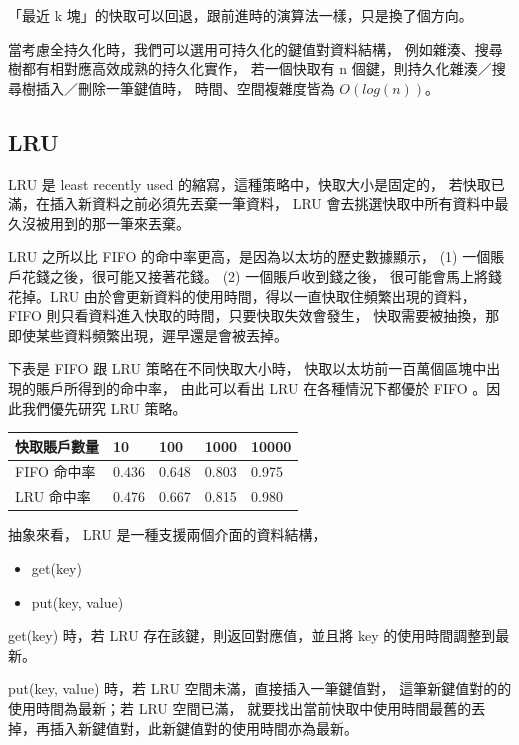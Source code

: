 「最近 k 塊」的快取可以回退，跟前進時的演算法一樣，只是換了個方向。

當考慮全持久化時，我們可以選用可持久化的鍵值對資料結構，
例如雜湊\cite{bagwell2001ideal}\cite{puente2017persistence}\cite{hinze2006finger}、搜尋樹都有相對應高效成熟的持久化實作，
若一個快取有 n 個鍵，則持久化雜湊／搜尋樹插入／刪除一筆鍵值時，
時間、空間複雜度皆為 $O(log(n))$。

\subsection{LRU}

LRU 是 least recently used 的縮寫，這種策略中，快取大小是固定的，
若快取已滿，在插入新資料之前必須先丟棄一筆資料，
LRU 會去挑選快取中所有資料中最久沒被用到的那一筆來丟棄。

LRU 之所以比 FIFO 的命中率更高，是因為以太坊的歷史數據顯示，
(1) 一個賬戶花錢之後，很可能又接著花錢。 (2) 一個賬戶收到錢之後，
很可能會馬上將錢花掉。LRU 由於會更新資料的使用時間，得以一直快取住頻繁出現的資料，
FIFO 則只看資料進入快取的時間，只要快取失效會發生，
快取需要被抽換，那即使某些資料頻繁出現，遲早還是會被丟掉。

下表是 FIFO 跟 LRU 策略在不同快取大小時，
快取以太坊前一百萬個區塊中出現的賬戶所得到的命中率，
由此可以看出 LRU 在各種情況下都優於 FIFO 。因此我們優先研究 LRU 策略。

\begin{center}
\begin{tabular}{ | m{6em} | m{1cm}| m{1cm} | m{1cm} | m{1cm} | } 
\hline
快取賬戶數量& 10 & 100 & 1000 & 10000 \\ 
\hline
FIFO 命中率& 0.436 & 0.648 & 0.803 & 0.975 \\ 
\hline
LRU 命中率& 0.476 & 0.667 & 0.815 & 0.980\\ 
\hline
\end{tabular}
\end{center}


抽象來看， LRU 是一種支援兩個介面的資料結構，

\begin{itemize}
  \item get(key)
  \item put(key, value)
\end{itemize}

get(key) 時，若 LRU 存在該鍵，則返回對應值，並且將 key 的使用時間調整到最新。

put(key, value) 時，若 LRU 空間未滿，直接插入一筆鍵值對，
這筆新鍵值對的的使用時間為最新；若 LRU 空間已滿，
就要找出當前快取中使用時間最舊的丟掉，再插入新鍵值對，此新鍵值對的使用時間亦為最新。

